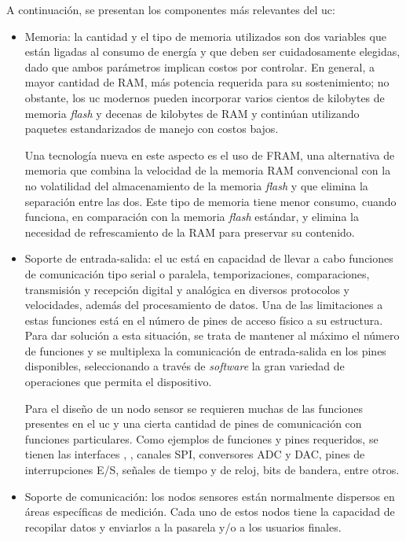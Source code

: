 A continuación, se presentan los componentes más relevantes del \gls{uc}:

\begin{itemize}
	\item Memoria:    
    la cantidad y el tipo de memoria utilizados son dos variables que están ligadas al consumo de energía y que deben ser cuidadosamente elegidas, dado que ambos parámetros implican costos por controlar. En general, a mayor cantidad de RAM, más potencia requerida para su sostenimiento; no obstante, los \gls{uc} modernos pueden incorporar varios cientos de kilobytes de memoria \emph{flash} y decenas de kilobytes de RAM y continúan utilizando paquetes estandarizados de manejo con costos bajos.
    
    Una tecnología nueva en este aspecto es el uso de FRAM, una alternativa de memoria que combina la velocidad de la memoria RAM convencional con la no volatilidad del almacenamiento de la memoria \emph{flash} y que elimina la separación entre las dos. Este tipo de memoria tiene menor consumo, cuando funciona, en comparación con la memoria \emph{flash} estándar, y elimina la necesidad de refrescamiento de la RAM para preservar su contenido.

    \item Soporte de entrada-salida: 
    el \gls{uc} está en capacidad de llevar a cabo funciones de comunicación tipo serial o paralela, temporizaciones, comparaciones, transmisión y recepción digital y analógica en diversos protocolos y velocidades, además del procesamiento de datos. Una de las limitaciones a estas funciones está en el número de pines de acceso físico a su estructura. Para dar solución a esta situación, se trata de mantener al máximo el número de funciones y se multiplexa la comunicación de  entrada-salida en los pines disponibles, seleccionando a través de \emph{software} la gran variedad de operaciones que permita el dispositivo.

    Para el diseño de un nodo sensor se requieren muchas de las funciones presentes en el \gls{uc} y una cierta cantidad de pines de comunicación con funciones particulares. Como ejemplos de funciones y pines requeridos, se tienen las interfaces \IC, \IS, canales SPI, conversores ADC y DAC, pines de interrupciones E/S, señales de tiempo y de reloj, bits de bandera, entre otros.

    \item Soporte de comunicación: 
    los nodos sensores están normalmente dispersos en áreas específicas de medición. Cada uno de estos nodos tiene la capacidad de recopilar datos y enviarlos a la pasarela y/o a los usuarios finales.


\end{itemize}

